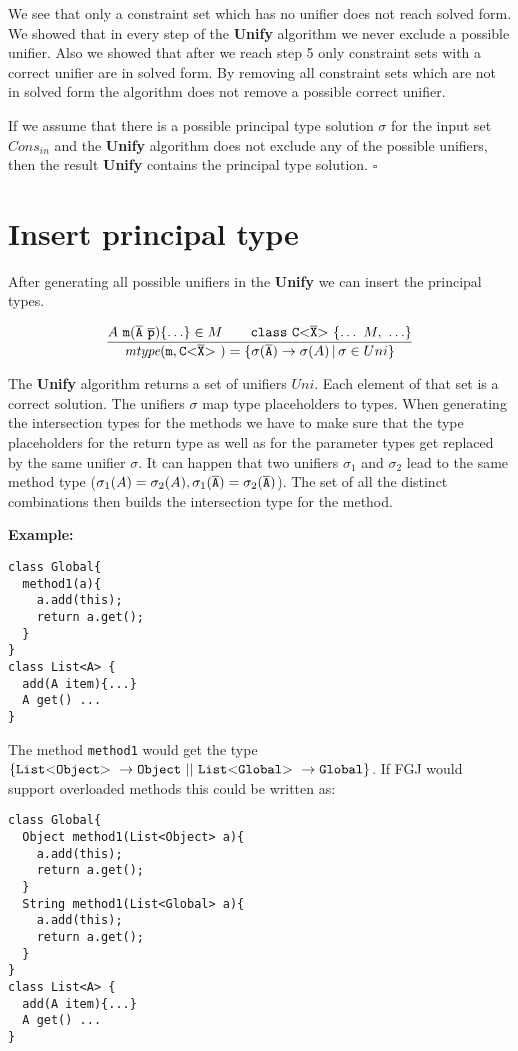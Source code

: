 \documentclass[runningheads]{llncs}
\begin{document}
\begin{description}
We see that only a constraint set which has no unifier does not reach solved form.
We showed that in every step of the \textbf{Unify} algorithm we never exclude a possible unifier.
Also we showed that after we reach step 5 only constraint sets with a correct unifier are in solved form.
By removing all constraint sets which are not in solved form the algorithm does not
remove a possible correct unifier.

If we assume that there is a possible principal type solution $\sigma$ for the input set $Cons_{in}$
and the \textbf{Unify} algorithm does not exclude any of the possible unifiers,
then the result \textbf{Unify} contains the principal type solution.
\hfill $\square$
\end{description}

\section{Insert principal type}
After generating all possible unifiers in the \textbf{Unify} we can insert the principal types.

\begin{align*}
\frac{\displaystyle 
  A\ \texttt{m}(\overline{\tt A}\ \overline{\tt p}) \{ \ldots \} \in M \quad \quad \texttt{class}\ \mathtt{C {\tt <} \overline{\tt X} {\tt >} \ } \{ \ldots\ M,\ \ldots\}
}{\displaystyle 
  \textit{mtype}(\texttt{m}, \mathtt{C {\tt <} \overline{\tt X} {\tt >} \ }) = \{ \sigma(\overline{\tt A}) \to \sigma(A) \,|\, \sigma \in {Uni} \}
}
\end{align*}

The \textbf{Unify} algorithm returns a set of unifiers ${Uni}$.
Each element of that set is a correct solution.
The unifiers $\sigma$ map type placeholders to types.
When generating the intersection types for the methods we have to make sure that the
type placeholders for the return type as well as for the parameter types get replaced by the same unifier $\sigma$.
It can happen that two unifiers $\sigma_1$ and $\sigma_2$ lead to the same method type ($\sigma_1(A) = \sigma_2(A), \sigma_1(\overline{\tt A}) = \sigma_2(\overline{\tt A})$).
The set of all the distinct combinations then builds the intersection type for the method.

\textbf{Example:}
\begin{lstlisting}
class Global{
  method1(a){
    a.add(this);
    return a.get();
  }
}
class List<A> {
  add(A item){...}
  A get() ...
}
\end{lstlisting}

The method \texttt{method1} would get the type $\{  \mathtt{List {\tt <} Object {\tt >} \ } \to \texttt{Object}
\ || \ \mathtt{List {\tt <} Global {\tt >} \ } \to \texttt{Global} \}$.
If FGJ would support overloaded methods this could be written as:
\begin{lstlisting}
class Global{
  Object method1(List<Object> a){
    a.add(this);
    return a.get();
  }
  String method1(List<Global> a){
    a.add(this);
    return a.get();
  }
}
class List<A> {
  add(A item){...}
  A get() ...
}
\end{lstlisting}
\end{document}

